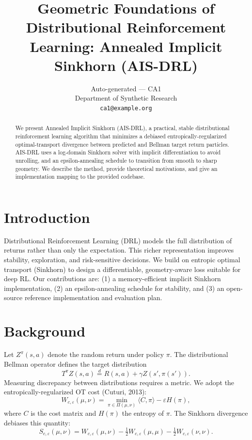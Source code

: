 \documentclass{article}
\title{Geometric Foundations of Distributional Reinforcement Learning: Annealed Implicit Sinkhorn (AIS-DRL)}
\author{Auto-generated — CA1\\
    Department of Synthetic Research \\
    \texttt{ca1@example.org}}
\begin{document}
\maketitle

\begin{abstract}
We present Annealed Implicit Sinkhorn (AIS-DRL), a practical, stable distributional reinforcement learning algorithm that minimizes a debiased entropically-regularized optimal-transport divergence between predicted and Bellman target return particles. AIS-DRL uses a log-domain Sinkhorn solver with implicit differentiation to avoid unrolling, and an epsilon-annealing schedule to transition from smooth to sharp geometry. We describe the method, provide theoretical motivations, and give an implementation mapping to the provided codebase.
\end{abstract}

\section{Introduction}
Distributional Reinforcement Learning (DRL) models the full distribution of returns rather than only the expectation. This richer representation improves stability, exploration, and risk-sensitive decisions. We build on entropic optimal transport (Sinkhorn) to design a differentiable, geometry-aware loss suitable for deep RL. Our contributions are: (1) a memory-efficient implicit Sinkhorn implementation, (2) an epsilon-annealing schedule for stability, and (3) an open-source reference implementation and evaluation plan.

\section{Background}
Let $Z^{\pi}(s,a)$ denote the random return under policy $\pi$. The distributional Bellman operator defines the target distribution
\begin{equation}
T^{\pi}Z(s,a) \stackrel{d}{=} R(s,a)+\gamma Z(s',\pi(s')).
\end{equation}
Measuring discrepancy between distributions requires a metric. We adopt the entropically-regularized OT cost (Cuturi, 2013):
\begin{equation}
W_{c,\varepsilon}(\mu,\nu)=\min_{\pi\in\Pi(\mu,\nu)}\langle C,\pi\rangle-\varepsilon H(\pi),
\end{equation}
where $C$ is the cost matrix and $H(\pi)$ the entropy of $\pi$. The Sinkhorn divergence debiases this quantity:
\begin{equation}
S_{c,\varepsilon}(\mu,\nu)=W_{c,\varepsilon}(\mu,\nu)-\tfrac{1}{2}W_{c,\varepsilon}(\mu,\mu)-\tfrac{1}{2}W_{c,\varepsilon}(\nu,\nu).
\end{equation}
\end{document}
